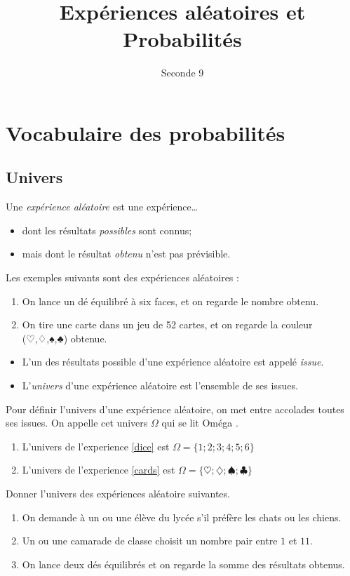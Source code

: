 \documentclass{article}
\title{Expériences aléatoires et Probabilités}
\author{Seconde 9}
\date{}
\begin{document}
\maketitle
\section{Vocabulaire des probabilités}
\subsection{Univers}
\begin{definitionbox}
Une \emph{expérience aléatoire} est une expérience\dots
\begin{itemize}
\item dont les résultats \emph{possibles} sont connus;
\item mais dont le résultat \emph{obtenu} n'est pas prévisible.
\end{itemize}
\end{definitionbox}
\begin{example} Les exemples suivants sont des expériences aléatoires :
\begin{enumerate}
\item On lance un dé équilibré à six faces, et on regarde le nombre obtenu.
\label{dice}
\item On tire une carte dans un jeu de 52 cartes, et on regarde la couleur (♡,♢,♠,♣) obtenue. 
\label{cards}
\end{enumerate}
\end{example}
\begin{definitionbox}
\begin{itemize}
\item L'un des résultats possible d'une expérience aléatoire est appelé \emph{issue}.
\item L'\emph{univers} d'une expérience aléatoire est l'ensemble de ses issues.
\end{itemize}
\end{definitionbox}
\begin{example}
Pour définir l'univers d'une expérience aléatoire, on met entre accolades toutes ses issues. On appelle cet univers $\Omega$ qui se lit \og Oméga \fg.
\begin{enumerate}
\item L'univers de l'experience \ref{dice} est $\Omega = \{1;2;3;4;5;6\}$ 
\item L'univers de l'experience \ref{cards} est $\Omega = \{♡;♢;♠;♣\}$ 
\end{enumerate}    
\end{example}
\begin{exercize}
Donner l'univers des expériences aléatoire suivantes.
\begin{enumerate}[label=\alph*)]
\item On demande à un ou une élève du lycée s'il préfère les chats ou les chiens.
\item Un ou une camarade de classe choisit un nombre pair entre $1$ et $11$.
\item On lance deux dés équilibrés et on regarde la somme des résultats obtenus.
\end{enumerate}
\end{exercize}
\emptybox{7cm}
\newpage
\end{document}
